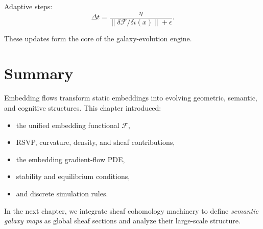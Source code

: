 Adaptive steps:
\[
  \Delta t
  =
  \frac{\eta}{\|\delta\mathcal{F}/\delta\iota(x)\| + \epsilon}.
\]

These updates form the core of the galaxy-evolution engine.

\section{Summary}

Embedding flows transform static embeddings into evolving
geometric, semantic, and cognitive structures.
This chapter introduced:

\begin{itemize}
  \item the unified embedding functional $\mathcal{F}$,
  \item RSVP, curvature, density, and sheaf contributions,
  \item the embedding gradient-flow PDE,
  \item stability and equilibrium conditions,
  \item and discrete simulation rules.
\end{itemize}

In the next chapter, we integrate sheaf cohomology machinery
to define \emph{semantic galaxy maps} as global sheaf sections
and analyze their large-scale structure.
